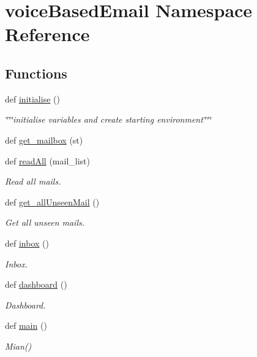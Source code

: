 \hypertarget{namespacevoiceBasedEmail}{}\section{voice\+Based\+Email Namespace Reference}
\label{namespacevoiceBasedEmail}
\subsection*{Functions}
\begin{DoxyCompactItemize}
\item 
def \hyperlink{namespacevoiceBasedEmail_a7f64e055c373a69d649b9f6dc95d5b65}{initialise} ()
\begin{DoxyCompactList}\small\item\em \char`\"{}\char`\"{}\char`\"{}initialise  variables and create starting environment\char`\"{}\char`\"{}\char`\"{} \end{DoxyCompactList}\item 
def \hyperlink{namespacevoiceBasedEmail_a69b906256292689b07c1988f88238a1c}{get\+\_\+mailbox} (st)
\item 
def \hyperlink{namespacevoiceBasedEmail_a15c38e2e034d72a5ac7cbae407bfee32}{read\+All} (mail\+\_\+list)
\begin{DoxyCompactList}\small\item\em Read all mails. \end{DoxyCompactList}\item 
def \hyperlink{namespacevoiceBasedEmail_a50a8c6217718182113988136063f0b02}{get\+\_\+all\+Unseen\+Mail} ()
\begin{DoxyCompactList}\small\item\em Get all unseen mails. \end{DoxyCompactList}\item 
def \hyperlink{namespacevoiceBasedEmail_a3b5985596aae846804bab620c9131061}{inbox} ()
\begin{DoxyCompactList}\small\item\em Inbox. \end{DoxyCompactList}\item 
def \hyperlink{namespacevoiceBasedEmail_a78909b6db7071b2cbe1e43461c83290f}{dashboard} ()
\begin{DoxyCompactList}\small\item\em Dashboard. \end{DoxyCompactList}\item 
def \hyperlink{namespacevoiceBasedEmail_acdfa4990ff348bcc34fd0d6f74380fd6}{main} ()
\begin{DoxyCompactList}\small\item\em Mian() \end{DoxyCompactList}\end{DoxyCompactItemize}

